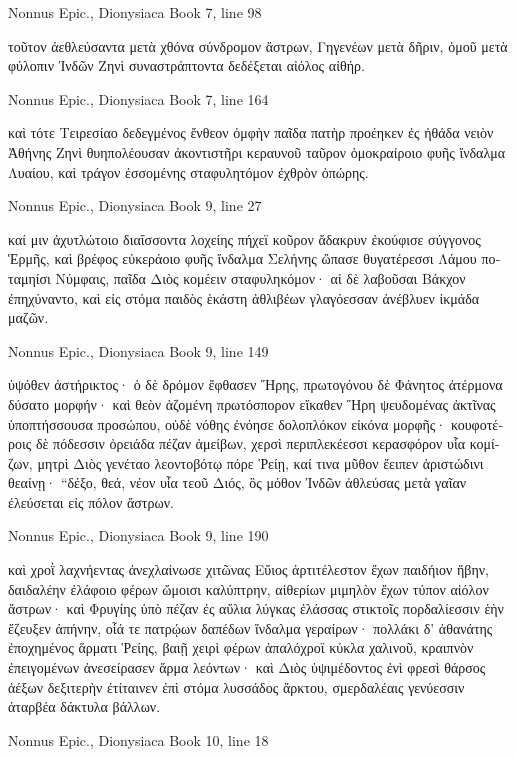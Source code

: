 \documentclass[12pt,letterpaper,twoside,final]{memoir}
\begin{document}
\begin{greek}
Nonnus Epic., Dionysiaca 
Book 7, line 98

τοῦτον ἀεθλεύσαντα μετὰ χθόνα σύνδρομον ἄστρων, 
Γηγενέων μετὰ δῆριν, ὁμοῦ μετὰ φύλοπιν Ἰνδῶν 
Ζηνὶ συναστράπτοντα δεδέξεται αἰόλος αἰθήρ. 



Nonnus Epic., Dionysiaca 
Book 7, line 164

καὶ τότε Τειρεσίαο δεδεγμένος ἔνθεον ὀμφὴν 
παῖδα πατὴρ προέηκεν ἐς ἠθάδα νειὸν Ἀθήνης 
Ζηνὶ θυηπολέουσαν ἀκοντιστῆρι κεραυνοῦ 
ταῦρον ὁμοκραίροιο φυῆς ἴνδαλμα Λυαίου, 
καὶ τράγον ἐσσομένης σταφυλητόμον ἐχθρὸν ὀπώρης. 



Nonnus Epic., Dionysiaca 
Book 9, line 27

καί μιν ἀχυτλώτοιο διαΐσσοντα λοχείης 
πήχεϊ κοῦρον ἄδακρυν ἐκούφισε σύγγονος Ἑρμῆς, 
καὶ βρέφος εὐκεράοιο φυῆς ἴνδαλμα Σελήνης 
ὤπασε θυγατέρεσσι Λάμου ποταμηίσι Νύμφαις, 
παῖδα Διὸς κομέειν σταφυληκόμον· αἱ δὲ λαβοῦσαι 
Βάκχον ἐπηχύναντο, καὶ εἰς στόμα παιδὸς ἑκάστη 
ἀθλιβέων γλαγόεσσαν ἀνέβλυεν ἰκμάδα μαζῶν. 



Nonnus Epic., Dionysiaca 
Book 9, line 149

ὑψόθεν ἀστήρικτος· ὁ δὲ δρόμον ἔφθασεν Ἥρης, 
πρωτογόνου δὲ Φάνητος ἀτέρμονα δύσατο μορφήν· 
καὶ θεὸν ἁζομένη πρωτόσπορον εἴκαθεν Ἥρη 
ψευδομένας ἀκτῖνας ὑποπτήσσουσα προσώπου, 
οὐδὲ νόθης ἐνόησε δολοπλόκον εἰκόνα μορφῆς· 
κουφοτέροις δὲ πόδεσσιν ὀρειάδα πέζαν ἀμείβων, 
χερσὶ περιπλεκέεσσι κερασφόρον υἷα κομίζων, 
μητρὶ Διὸς γενέταο λεοντοβότῳ πόρε Ῥείῃ, 
καί τινα μῦθον ἔειπεν ἀριστώδινι θεαίνῃ· 
 “δέξο, θεά, νέον υἷα τεοῦ Διός, ὃς μόθον Ἰνδῶν 
ἀθλεύσας μετὰ γαῖαν ἐλεύσεται εἰς πόλον ἄστρων. 



Nonnus Epic., Dionysiaca 
Book 9, line 190

καὶ χροῒ λαχνήεντας ἀνεχλαίνωσε χιτῶνας 
Εὔιος ἀρτιτέλεστον ἔχων παιδήιον ἥβην, 
δαιδαλέην ἐλάφοιο φέρων ὤμοισι καλύπτρην, 
αἰθερίων μιμηλὸν ἔχων τύπον αἰόλον ἄστρων· 
καὶ Φρυγίης ὑπὸ πέζαν ἐς αὔλια λύγκας ἐλάσσας 
στικτοῖς πορδαλίεσσιν ἑὴν ἔζευξεν ἀπήνην, 
οἷά τε πατρῴων δαπέδων ἴνδαλμα γεραίρων· 
πολλάκι δ' ἀθανάτης ἐποχημένος ἅρματι Ῥείης, 
βαιῇ χειρὶ φέρων ἁπαλόχροϊ κύκλα χαλινοῦ, 
κραιπνὸν ἐπειγομένων ἀνεσείρασεν ἅρμα λεόντων· 
καὶ Διὸς ὑψιμέδοντος ἐνὶ φρεσὶ θάρσος ἀέξων 
δεξιτερὴν ἐτίταινεν ἐπὶ στόμα λυσσάδος ἄρκτου, 
σμερδαλέαις γενύεσσιν ἀταρβέα δάκτυλα βάλλων. 



Nonnus Epic., Dionysiaca 
Book 10, line 18


\end{greek}
\end{document}
